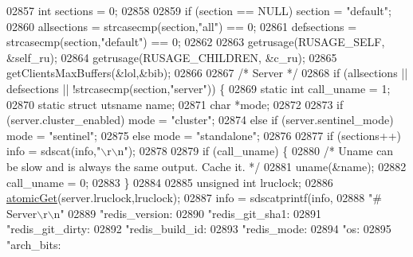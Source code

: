 \begin{DoxyCode}
{{{{{{{{{{{{{{{{{{{{{{{{{{{{{{{{{{{{{{{{{02857     \textcolor{keywordtype}{int} sections = 0;
02858 
02859     \textcolor{keywordflow}{if} (section == NULL) section = \textcolor{stringliteral}{"default"};
02860     allsections = strcasecmp(section,\textcolor{stringliteral}{"all"}) == 0;
02861     defsections = strcasecmp(section,\textcolor{stringliteral}{"default"}) == 0;
02862 
02863     getrusage(RUSAGE\_SELF, &self\_ru);
02864     getrusage(RUSAGE\_CHILDREN, &c\_ru);
02865     getClientsMaxBuffers(&lol,&bib);
02866 
02867     \textcolor{comment}{/* Server */}
02868     \textcolor{keywordflow}{if} (allsections || defsections || !strcasecmp(section,\textcolor{stringliteral}{"server"})) \{
02869         \textcolor{keyword}{static} \textcolor{keywordtype}{int} call\_uname = 1;
02870         \textcolor{keyword}{static} \textcolor{keyword}{struct} utsname name;
02871         \textcolor{keywordtype}{char} *mode;
02872 
02873         \textcolor{keywordflow}{if} (server.cluster\_enabled) mode = \textcolor{stringliteral}{"cluster"};
02874         \textcolor{keywordflow}{else} \textcolor{keywordflow}{if} (server.sentinel\_mode) mode = \textcolor{stringliteral}{"sentinel"};
02875         \textcolor{keywordflow}{else} mode = \textcolor{stringliteral}{"standalone"};
02876 
02877         \textcolor{keywordflow}{if} (sections++) info = sdscat(info,\textcolor{stringliteral}{"\(\backslash\)r\(\backslash\)n"});
02878 
02879         \textcolor{keywordflow}{if} (call\_uname) \{
02880             \textcolor{comment}{/* Uname can be slow and is always the same output. Cache it. */}
02881             uname(&name);
02882             call\_uname = 0;
02883         \}
02884 
02885         \textcolor{keywordtype}{unsigned} \textcolor{keywordtype}{int} lruclock;
02886         \hyperlink{atomicvar_8h_a57b17e058ecff6871debb3d1d4f3031a}{atomicGet}(server.lruclock,lruclock);
02887         info = sdscatprintf(info,
02888             \textcolor{stringliteral}{"# Server\(\backslash\)r\(\backslash\)n"}
02889             \textcolor{stringliteral}{"redis\_version:%
02890             \textcolor{stringliteral}{"redis\_git\_sha1:%
02891             \textcolor{stringliteral}{"redis\_git\_dirty:%
02892             \textcolor{stringliteral}{"redis\_build\_id:%
02893             \textcolor{stringliteral}{"redis\_mode:%
02894             \textcolor{stringliteral}{"os:%
02895             \textcolor{stringliteral}{"arch\_bits:%
}}}}}}}}}}}}}}}}}}}}}}}}}}}}}}}}}}}}}}}}}}}}}}}}
\end{DoxyCode}
